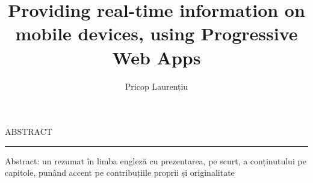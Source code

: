 \documentclass[12pt]{report}
\begin{document}
\title{Providing real-time information on mobile devices, using Progressive Web Apps}
\author{Pricop Laurențiu}

\maketitle

\newpage
\thispagestyle{empty}
\mbox{}
\newpage
{}

\cleardoublepage
ABSTRACT
\vspace{0.5cm}
\hrule
\vspace{0.5cm}

Abstract: un rezumat în limba engleză cu prezentarea, pe scurt, a conținutului pe capitole, punând accent pe contribuțiile proprii și originalitate



\tableofcontents


\newpage
{}











\end{document}
